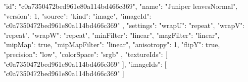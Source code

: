 {
  "id": "c0a7350472bed961e80a114bd466c369",
  "name": "Juniper leavesNormal",
  "version": 1,
  "source": {
    "kind": "image",
    "imageId": "c0a7350472bed961e80a114bd466c369"
  },
  "settings": {
    "wrapU": "repeat",
    "wrapV": "repeat",
    "wrapW": "repeat",
    "minFilter": "linear",
    "magFilter": "linear",
    "mipMap": true,
    "mipMapFilter": "linear",
    "anisotropy": 1,
    "flipY": true,
    "precision": "low",
    "colorSpace": "srgb"
  },
  "textureIds": [
    "c0a7350472bed961e80a114bd466c369"
  ],
  "imageIds": [
    "c0a7350472bed961e80a114bd466c369"
  ]
}
